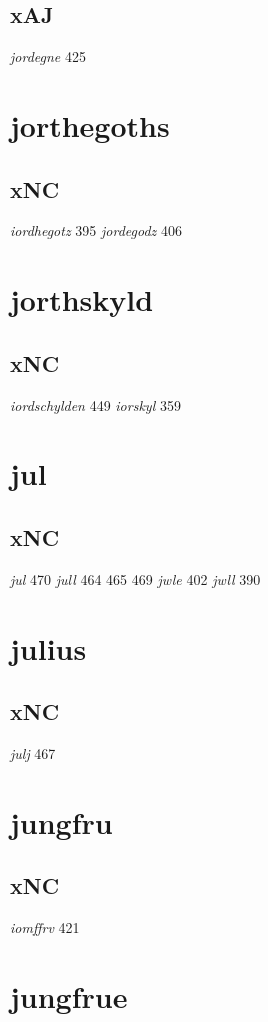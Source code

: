 \documentclass[a4paper,twocolumn]{article}
\begin{document}
\subsection{xAJ}
\label{sec:org9d3039e}
\emph{jordegne} 425 
\section{jorthegoths}
\label{sec:org5564b22}
\subsection{xNC}
\label{sec:org6d270ef}
\emph{iordhegotz} 395 \emph{jordegodz} 406 
\section{jorthskyld}
\label{sec:org3c059b0}
\subsection{xNC}
\label{sec:orge6e6486}
\emph{iordschylden} 449 \emph{iorskyl} 359 
\section{jul}
\label{sec:org187dab8}
\subsection{xNC}
\label{sec:org5804c31}
\emph{jul} 470 \emph{jull} 464 465 469 \emph{jwle} 402 \emph{jwll} 390 
\section{julius}
\label{sec:org3a1de8b}
\subsection{xNC}
\label{sec:org4f522ac}
\emph{julj} 467 
\section{jungfru}
\label{sec:org793c242}
\subsection{xNC}
\label{sec:orgf5ffa47}
\emph{iomffrv} 421 
\section{jungfrue}
\label{sec:org59c77f1}
\end{document}
